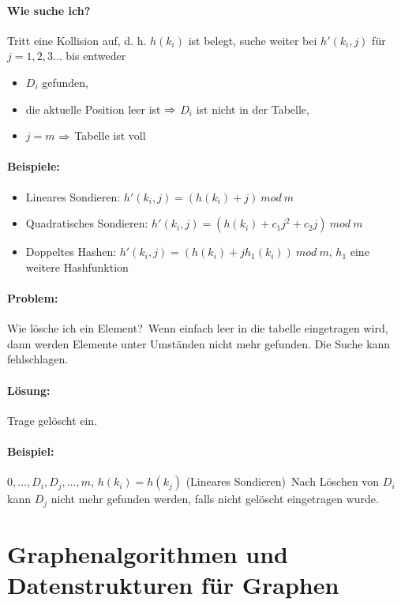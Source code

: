 \documentclass[a4paper]{scrartcl}
\begin{document}
	\paragraph{Wie suche ich? } Tritt eine Kollision auf, d. h. $h(k_i)$ ist belegt, suche weiter bei $h'(k_i,j)$ für $j=1,2,3\ldots$ bis entweder
	\begin{itemize}
		\item $D_i$ gefunden,
		\item die aktuelle Position leer ist $\Rightarrow$ $D_i$ ist nicht in der Tabelle,
		\item $j=m$ $\Rightarrow$ Tabelle ist voll
	\end{itemize}
	\paragraph{Beispiele: }
	\begin{itemize}
		\item	Lineares Sondieren: $h'(k_i,j) = (h(k_i)+j)\ mod\ m$
		\item Quadratisches Sondieren: $h'(k_i,j) = (h(k_i)+c_1j^2 +c_2j)\ mod\ m$
		\item Doppeltes Hashen: $h'(k_i,j) = (h(k_i)+jh_1(k_i))\ mod\ m$, $h_1$ eine weitere Hashfunktion
	\end{itemize}
	\paragraph{Problem: } Wie lösche ich ein Element?\
	Wenn einfach \glqq leer\grqq{} in die tabelle eingetragen wird, dann werden Elemente unter Umständen nicht mehr gefunden. Die Suche kann fehlschlagen.
	\paragraph{Lösung: } Trage \glqq gelöscht\grqq{} ein.
	\paragraph{Beispiel: } $0,\ldots ,D_i,D_j,\ldots ,m$, $h(k_i)=h(k_j)$ (Lineares Sondieren)\
	Nach Löschen von $D_i$ kann $D_j$ nicht mehr gefunden werden, falls nicht \glqq gelöscht\grqq{}  eingetragen wurde.
	
\section{Graphenalgorithmen und Datenstrukturen für Graphen}
\end{document}
